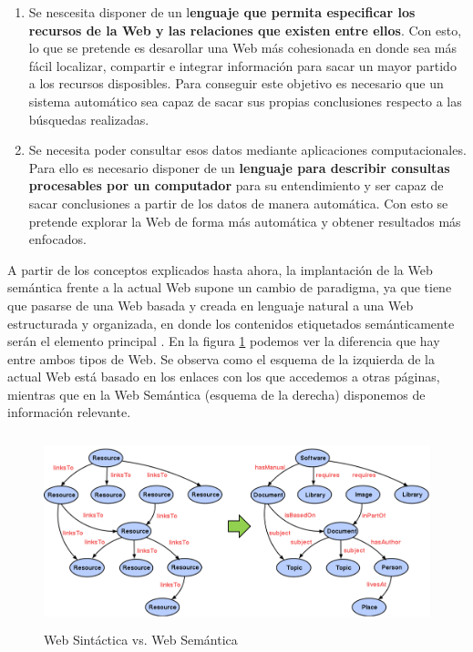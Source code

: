 \begin{enumerate}
	\item Se nescesita disponer de un l\textbf{enguaje que permita especificar los recursos de la Web y las relaciones que existen entre ellos}. Con esto, lo que se pretende es desarollar una Web más cohesionada en donde sea más fácil localizar, compartir e integrar información para sacar un mayor partido a los recursos disposibles. Para conseguir este objetivo es necesario que un sistema automático sea capaz de sacar sus propias conclusiones respecto a las búsquedas realizadas.
	
	\item Se necesita poder consultar esos datos mediante aplicaciones computacionales. Para ello es necesario disponer de un \textbf{lenguaje para describir consultas procesables por un computador} para su entendimiento y ser capaz de sacar conclusiones a partir de los datos de manera automática. Con esto se pretende explorar la Web de forma más automática y obtener resultados más enfocados.
\end{enumerate}

A partir de los conceptos explicados hasta ahora, la implantación de la Web semántica frente a la actual Web supone un cambio de paradigma, ya que tiene que pasarse de una Web basada y creada en lenguaje natural a una Web estructurada y organizada, en donde los contenidos etiquetados semánticamente serán el elemento principal \cite{researchgate}. En la figura \ref{wa-ws} podemos ver la diferencia que hay entre ambos tipos de Web. Se observa como el esquema de la izquierda de la actual Web está basado en los enlaces con los que accedemos a otras páginas, mientras que en la Web Semántica (esquema de la derecha) disponemos de información relevante.

\begin{figure}[H]
	\centering
	\includegraphics[height=5.60cm]{imagenes/capitulo3/web-actual-web-semantica.png}
	\caption{Web Sintáctica vs. Web Semántica}
	\label{wa-ws}
\end{figure}

